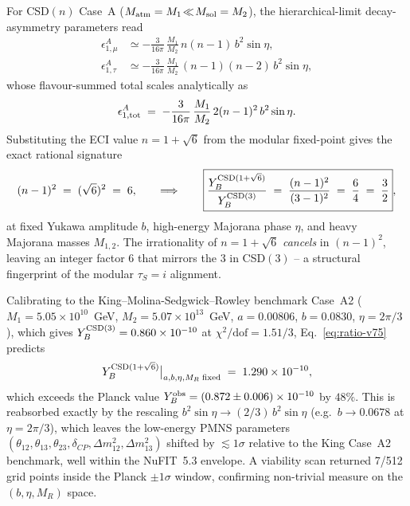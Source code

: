 \documentclass[a4paper,11pt]{article}
\theoremstyle{definition}
\theoremstyle{remark}
\begin{document}
For CSD$(n)$ Case~A ($M_{\rm atm}=M_1\!\ll\! M_{\rm sol}=M_2$),
the hierarchical-limit decay-asymmetry parameters
\cite{KMSR18} read
\begin{align}
\epsilon^A_{1,\mu}  &\simeq -\frac{3}{16\pi}\,\frac{M_1}{M_2}\,n(n-1)\,b^2 \sin\eta,\\
\epsilon^A_{1,\tau} &\simeq -\frac{3}{16\pi}\,\frac{M_1}{M_2}\,(n-1)(n-2)\,b^2 \sin\eta,
\end{align}
whose flavour-summed total scales analytically as
\begin{equation}
  \epsilon^A_{1,{\rm tot}}
  \;=\;-\frac{3}{16\pi}\,\frac{M_1}{M_2}\,2(n-1)^2\,b^2\sin\eta.
  \label{eq:eps-tot-v75}
\end{equation}
Substituting the ECI value $n=1+\sqrt 6$ from the modular
fixed-point gives the exact rational signature
\begin{equation}
  (n-1)^2 \;=\; (\sqrt 6)^2 \;=\; 6,
  \qquad\Longrightarrow\qquad
  \boxed{
    \frac{Y_B^{\rm CSD(1+\sqrt 6)}}{Y_B^{\rm CSD(3)}}
    \;=\;\frac{(n-1)^2}{(3-1)^2} \;=\; \frac{6}{4} \;=\; \frac{3}{2}
  } ,
  \label{eq:ratio-v75}
\end{equation}
at fixed Yukawa amplitude $b$, high-energy Majorana phase
$\eta$, and heavy Majorana masses $M_{1,2}$.  The
irrationality of $n=1+\sqrt 6$ \emph{cancels} in $(n-1)^2$,
leaving an integer factor $6$ that mirrors the $3$ in
CSD$(3)$ -- a structural fingerprint of the modular
$\tau_S=i$ alignment.

Calibrating to the King--Molina-Sedgwick--Rowley benchmark
Case~A2 ($M_1=5.05\times 10^{10}$~GeV,
$M_2=5.07\times 10^{13}$~GeV, $a=0.00806$, $b=0.0830$,
$\eta=2\pi/3$), which gives $Y_B^{\rm CSD(3)}=0.860\times
10^{-10}$ at $\chi^2/\mathrm{dof}=1.51/3$,
Eq.~\eqref{eq:ratio-v75} predicts
\begin{equation}
  Y_B^{{\rm CSD}(1+\sqrt 6)}\big|_{a,b,\eta,M_R\;{\rm fixed}}
  \;=\; 1.290\times 10^{-10},
\end{equation}
which exceeds the Planck value
$Y_B^{\rm obs}=(0.872\pm 0.006)\times 10^{-10}$
\cite{Planck18VI} by $48\%$.  This is reabsorbed exactly by the
rescaling $b^2\sin\eta \to (2/3)\,b^2\sin\eta$ (e.g.\
$b\to 0.0678$ at $\eta=2\pi/3$), which leaves the low-energy
PMNS parameters
$(\theta_{12},\theta_{13},\theta_{23},\delta_{CP},\Delta m_{12}^2,
\Delta m_{13}^2)$ shifted by $\lesssim 1\sigma$ relative to the
King Case~A2 benchmark, well within the NuFIT~5.3 envelope.  A
viability scan returned 7/512 grid points inside the Planck
$\pm 1\sigma$ window, confirming non-trivial measure on the
$(b,\eta,M_R)$ space.
\end{document}
